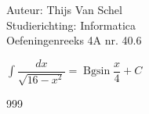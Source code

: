\documentclass[a4paper]{article}
\newcommand{\dint}{\displaystyle\int}
\begin{document}
  
\noindent \large Auteur: Thijs Van Schel \\
\noindent \large Studierichting: Informatica\\
\noindent \large Oefeningenreeks 4A nr. 40.6\\

\medskip

\normalsize

$\dint \dfrac{dx}{\sqrt{16-x^2}} = \operatorname{Bgsin}\dfrac{x}{4} + C$

\begin{thebibliography}{999}
\end{thebibliography}
\end{document}
